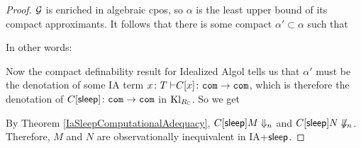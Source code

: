 \documentclass{article}
\begin{document}
\begin{proof}
  $\mathcal G$ is enriched in algebraic cpos, so $\alpha$ is the least upper bound of its compact approximants.  
  It follows that there is some compact $\alpha'\subset \alpha$ such that
  In other words:
  Now the compact definability result for Idealized Algol \cite[17]{SamsonGuyIAActive} tells us that $\alpha'$ must be the denotation of some IA term $x\colon T {\;\vdash} C[x] \colon {\mathtt{com}} \to {\mathtt{com}}$, which is therefore the denotation of $C[{\mathsf{sleep}}] \colon {\mathtt{com}} \to {\mathtt{com}}$ in $\operatorname{Kl}_{R_{\mathbb{C}}}$.
  So we get
  By Theorem \ref{IaSleepComputationalAdequacy}, $C[{\mathsf{sleep}}] M\Downarrow_n$ and $C[{\mathsf{sleep}}] N\not\Downarrow_n$.  
  Therefore, $M$ and $N$ are observationally inequivalent in IA+${\mathsf{sleep}}$.
\end{proof}



\end{document}
